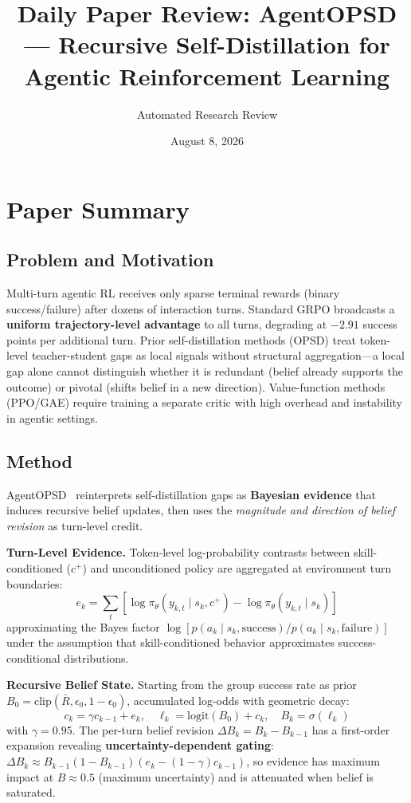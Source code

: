 \documentclass[11pt,a4paper]{article}
\title{Daily Paper Review: AgentOPSD --- Recursive Self-Distillation for Agentic Reinforcement Learning}
\author{Automated Research Review}
\date{August 8, 2026}
\begin{document}
\maketitle

\section{Paper Summary}

\subsection{Problem and Motivation}
Multi-turn agentic RL receives only sparse terminal rewards (binary success/failure) after dozens of interaction turns. Standard GRPO broadcasts a \textbf{uniform trajectory-level advantage} to all turns, degrading at $-2.91$ success points per additional turn. Prior self-distillation methods (OPSD) treat token-level teacher-student gaps as local signals without structural aggregation---a local gap alone cannot distinguish whether it is redundant (belief already supports the outcome) or pivotal (shifts belief in a new direction). Value-function methods (PPO/GAE) require training a separate critic with high overhead and instability in agentic settings.

\subsection{Method}
AgentOPSD~\cite{wang2026agentopsd} reinterprets self-distillation gaps as \textbf{Bayesian evidence} that induces recursive belief updates, then uses the \emph{magnitude and direction of belief revision} as turn-level credit.

\textbf{Turn-Level Evidence.} Token-level log-probability contrasts between skill-conditioned ($c^+$) and unconditioned policy are aggregated at environment turn boundaries:
\begin{equation}
    e_k = \sum_t \left[\log \pi_\theta(y_{k,t} \mid s_k, c^+) - \log \pi_\theta(y_{k,t} \mid s_k)\right]
\end{equation}
approximating the Bayes factor $\log[p(a_k \mid s_k, \text{success}) / p(a_k \mid s_k, \text{failure})]$ under the assumption that skill-conditioned behavior approximates success-conditional distributions.

\textbf{Recursive Belief State.} Starting from the group success rate as prior $B_0 = \text{clip}(\bar{R}, \epsilon_0, 1-\epsilon_0)$, accumulated log-odds with geometric decay:
\begin{equation}
    c_k = \gamma c_{k-1} + e_k, \quad \ell_k = \text{logit}(B_0) + c_k, \quad B_k = \sigma(\ell_k)
\end{equation}
with $\gamma = 0.95$. The per-turn belief revision $\Delta B_k = B_k - B_{k-1}$ has a first-order expansion revealing \textbf{uncertainty-dependent gating}: $\Delta B_k \approx B_{k-1}(1-B_{k-1})(e_k - (1-\gamma)c_{k-1})$, so evidence has maximum impact at $B \approx 0.5$ (maximum uncertainty) and is attenuated when belief is saturated.
\end{document}

